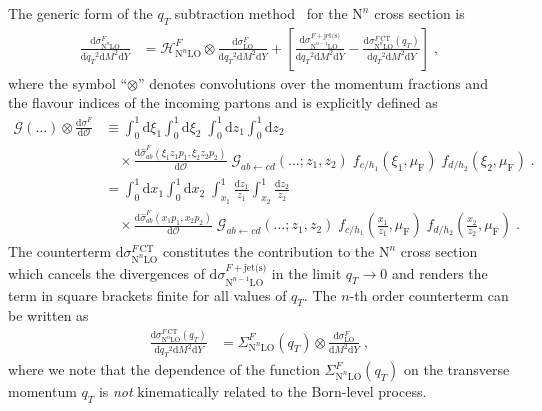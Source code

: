 \documentclass[12pt]{article}
\DeclareRobustCommand{\nn}{\nonumber}
\DeclareRobustCommand{\muf}{\ensuremath{\mu_{\mathrm{F}}}\xspace}
\DeclareRobustCommand{\qt}{\ensuremath{q_T}\xspace}
\DeclareRobustCommand{\rd}{\ensuremath{\mathrm{d}}}
\DeclareRobustCommand{\cO}{\ensuremath{\mathcal{O}}}
\DeclareRobustCommand{\cG}{\ensuremath{\mathcal{G}}}
\DeclareRobustCommand{\cH}{\ensuremath{\mathcal{H}}}
\DeclareRobustCommand{\obs}{\cO\xspace}
\DeclareRobustCommand{\jets}{\text{jet(s)}\xspace}
\DeclareRobustCommand{\CT}{\text{CT}\xspace}
\DeclareRobustCommand{\LO}{\text{LO}\xspace}
\DeclareRobustCommand{\N}[1]{\ensuremath{\text{N}^{#1}}} %
\begin{document}
The generic form of the $\qt$ subtraction method~\cite{Catani:2007vq} for the \N{n}\LO cross section is
\begin{align}
  \frac{\rd\sigma^{F}_{\N{n}\LO}}{\rd\qt^2\rd M^2\rd Y}
  &=
  \cH^F_{\N{n}\LO} \otimes
  \frac{\rd\sigma^{F}_{\LO}}{\rd\qt^2\rd M^2\rd Y} +
  \left[ 
    \frac{\rd\sigma^{F+\jets}_{\N{n-1}\LO}}{\rd\qt^2\rd M^2\rd Y} -
    \frac{\rd\sigma^{F\,\CT}_{\N{n}\LO}(\qt)}{\rd\qt^2\rd M^2\rd Y}
  \right] \;,
  \label{eq:master}
\end{align}
where the symbol ``$\otimes$'' denotes convolutions over the momentum fractions and the flavour indices of the incoming partons and is explicitly defined as
\begin{align}
  \cG(\dots) \otimes \frac{\rd\sigma^{F}}{\rd\obs} 
  &\equiv
  \int_0^1\rd\xi_1 \int_0^1\rd\xi_2 \;
  \int_0^1\rd z_1  \int_0^1 \rd z_2 \; 
  \nonumber\\&\quad
  \times 
  \frac{\rd\hat{\sigma}^{F}_{ab}(\xi_1 z_1 p_1, \xi_2 z_2 p_2)}{\rd\obs} \;
  \cG_{ab \gets cd}(\ldots; z_1, z_2) \;
  f_{c/h_1}(\xi_1,\muf) \; f_{d/h_2}(\xi_2,\muf) \;.
  \nn\\&=
  \int_0^1\rd x_1 \int_0^1\rd x_2 \;
  \int_{x_1}^1 \frac{\rd z_1}{z_1} \int_{x_2}^1 \frac{\rd z_2}{z_2} \; 
  \nonumber\\&\quad
  \times 
  \frac{\rd\hat{\sigma}^{F}_{ab}(x_1 p_1, x_2 p_2)}{\rd\obs} \;
  \cG_{ab \gets cd}(\ldots; z_1, z_2) \;
  f_{c/h_1}\left(\frac{x_1}{z_1},\muf\right) \; f_{d/h_2}\left(\frac{x_2}{z_2},\muf\right) \;.
\end{align}
The counterterm $\rd\sigma^{F\,\CT}_{\N{n}\LO}$ constitutes the contribution to the \N{n}\LO cross section which cancels the divergences of $\rd\sigma^{F+\jets}_{\N{n-1}\LO}$ in the limit $\qt \rightarrow 0$ and renders the term in square brackets finite for all values of $\qt$. 
The $n$-th order counterterm can be written as
\begin{align}
  \frac{\rd\sigma^{F\,\CT}_{\N{n}\LO}(\qt)}{\rd\qt^2\rd M^2\rd Y}
  &=
  \Sigma^F_{\N{n}\LO}(\qt) \otimes
  \frac{\rd\sigma^{F}_{\LO}}{\rd M^2\rd Y} \;,
  \label{eq:CT}
\end{align}
where we note that the dependence of the function $\Sigma^{F}_{\N{n}\LO}(\qt)$ on the transverse momentum $\qt$ is \emph{not} kinematically related to the Born-level process.
\end{document}
